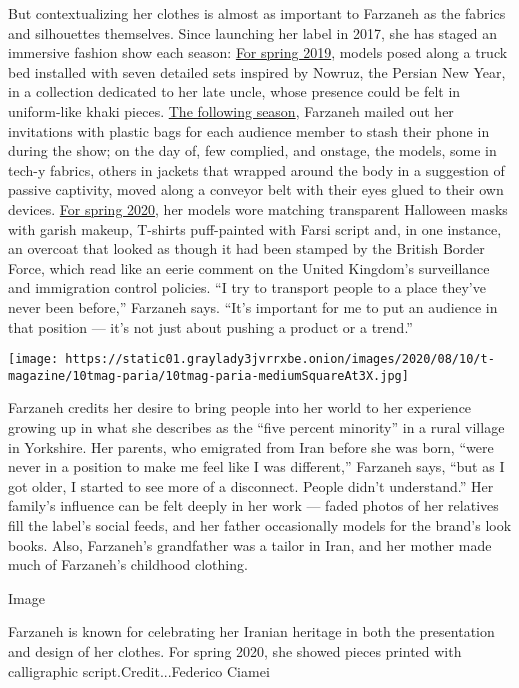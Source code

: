 But contextualizing her clothes is almost as important to Farzaneh as
the fabrics and silhouettes themselves. Since launching her label in
2017, she has staged an immersive fashion show each season:
\href{https://www.pariafarzaneh.com/ss19}{For spring 2019}, models posed
along a truck bed installed with seven detailed sets inspired by Nowruz,
the Persian New Year, in a collection dedicated to her late uncle, whose
presence could be felt in uniform-like khaki pieces.
\href{https://www.pariafarzaneh.com/aw19}{The following season},
Farzaneh mailed out her invitations with plastic bags for each audience
member to stash their phone in during the show; on the day of, few
complied, and onstage, the models, some in tech-y fabrics, others in
jackets that wrapped around the body in a suggestion of passive
captivity, moved along a conveyor belt with their eyes glued to their
own devices. \href{https://www.pariafarzaneh.com/ss20}{For spring 2020},
her models wore matching transparent Halloween masks with garish makeup,
T-shirts puff-painted with Farsi script and, in one instance, an
overcoat that looked as though it had been stamped by the British Border
Force, which read like an eerie comment on the United Kingdom's
surveillance and immigration control policies. ``I try to transport
people to a place they've never been before,'' Farzaneh says. ``It's
important for me to put an audience in that position --- it's not just
about pushing a product or a trend.''

\texttt{[image: https://static01.graylady3jvrrxbe.onion/images/2020/08/10/t-magazine/10tmag-paria/10tmag-paria-mediumSquareAt3X.jpg]}

Farzaneh credits her desire to bring people into her world to her
experience growing up in what she describes as the ``five percent
minority'' in a rural village in Yorkshire. Her parents, who emigrated
from Iran before she was born, ``were never in a position to make me
feel like I was different,'' Farzaneh says, ``but as I got older, I
started to see more of a disconnect. People didn't understand.'' Her
family's influence can be felt deeply in her work --- faded photos of
her relatives fill the label's social feeds, and her father occasionally
models for the brand's look books. Also, Farzaneh's grandfather was a
tailor in Iran, and her mother made much of Farzaneh's childhood
clothing.

Image

Farzaneh is known for celebrating her Iranian heritage in both the
presentation and design of her clothes. For spring 2020, she showed
pieces printed with calligraphic script.Credit...Federico Ciamei


